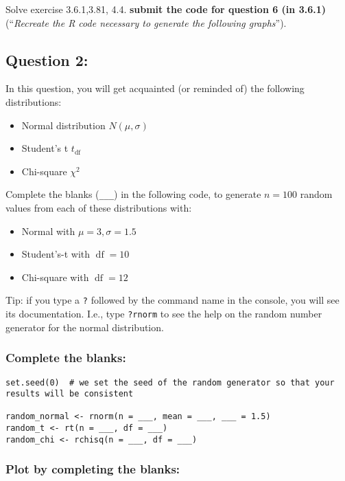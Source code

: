 \documentclass[
]{article}
\providecommand{\tightlist}{%
  \setlength{\itemsep}{0pt}\setlength{\parskip}{0pt}}
\begin{document}
Solve exercise 3.6.1,3.81, 4.4. \textbf{submit the code for question 6
(in 3.6.1)} (``\emph{Recreate the R code necessary to generate the
following graphs}'').

\hypertarget{question-2}{%
\subsection{Question 2:}\label{question-2}}

In this question, you will get acquainted (or reminded of) the following
distributions:

\begin{itemize}
\tightlist
\item
  Normal distribution \(N(\mu, \sigma)\)
\item
  Student's t \(t_{\operatorname{df}}\)
\item
  Chi-square \(\chi^2\)
\end{itemize}

Complete the blanks (\texttt{\_\_\_}) in the following code, to generate
\(n=100\) random values from each of these distributions with:

\begin{itemize}
\tightlist
\item
  Normal with \(\mu=3, \sigma = 1.5\)
\item
  Student's-t with \(\operatorname{df}=10\)
\item
  Chi-square with \(\operatorname{df}=12\)
\end{itemize}

Tip: if you type a \texttt{?} followed by the command name in the
console, you will see its documentation. I.e., type \texttt{?rnorm} to
see the help on the random number generator for the normal distribution.

\hypertarget{complete-the-blanks}{%
\subsubsection{Complete the blanks:}\label{complete-the-blanks}}

\begin{verbatim}
set.seed(0)  # we set the seed of the random generator so that your results will be consistent

random_normal <- rnorm(n = ___, mean = ___, ___ = 1.5)
random_t <- rt(n = ___, df = ___)
random_chi <- rchisq(n = ___, df = ___)
\end{verbatim}

\hypertarget{plot-by-completing-the-blanks}{%
\subsubsection{Plot by completing the
blanks:}\label{plot-by-completing-the-blanks}}
\end{document}
